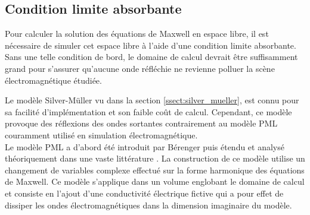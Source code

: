 \subsection{Condition limite absorbante}
\label{ssect:PML}

Pour calculer la solution des équations de Maxwell en espace libre, il est
nécessaire de simuler cet espace libre à l'aide d'une condition limite absorbante.
Sans une telle condition de bord, le domaine de calcul devrait être suffisamment
grand pour s'assurer qu'aucune onde réfléchie ne revienne polluer la scène électromagnétique
étudiée.

Le modèle Silver-Müller vu dans la section \ref{ssect:silver_mueller},
est connu pour sa facilité d'implémentation et son
faible coût de calcul. Cependant, ce modèle provoque des réflexions des ondes
sortantes contrairement au modèle PML couramment utilisé en
simulation électromagnétique.
\\


Le modèle PML a d'abord été introduit par Bérenger \cite{BERENGER1994185}
puis étendu et analysé théoriquement dans une vaste littérature
\cite{LASSAS2001739, laurens:tel-00475286, MAZET199859, MAZET2001599, 
LAHIVAARA20105144, Sullivan594858, Wrenger999615, Gedney546249, Fang556449}.
La construction de ce modèle utilise un changement de variables complexe effectué
sur la forme harmonique des équations de Maxwell. Ce modèle s'applique dans un
volume englobant le domaine de calcul et consiste en l'ajout d'une conductivité
électrique fictive qui a pour effet de dissiper les ondes électromagnétiques dans
la dimension imaginaire du modèle.
\\

